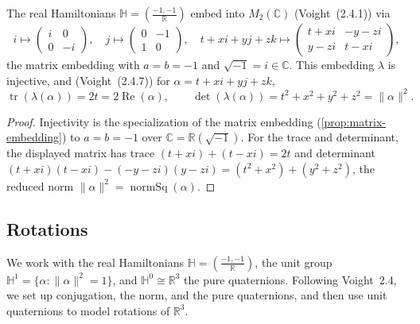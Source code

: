 \begin{lemma}
    \label{lem:hamilton-matrix}
    \leanok
    The real Hamiltonians $\mathbb{H} = \left(\frac{-1,-1}{\mathbb{R}}\right)$ embed
    into $M_2(\mathbb{C})$ (Voight~(2.4.1)) via
    \[
      i \mapsto \begin{pmatrix} i & 0 \\ 0 & -i \end{pmatrix}, \quad
      j \mapsto \begin{pmatrix} 0 & -1 \\ 1 & 0 \end{pmatrix}, \quad
      t + xi + yj + zk \mapsto
      \begin{pmatrix} t + xi & -y - zi \\ y - zi & t - xi \end{pmatrix},
    \]
    the matrix embedding with $a = b = -1$ and $\sqrt{-1} = i \in \mathbb{C}$. This
    embedding $\lambda$ is injective, and (Voight~(2.4.7)) for
    $\alpha = t + xi + yj + zk$,
    \[
      \operatorname{tr}(\lambda(\alpha)) = 2t = 2\operatorname{Re}(\alpha),
      \qquad
      \det(\lambda(\alpha)) = t^2 + x^2 + y^2 + z^2 = \lVert\alpha\rVert^2.
    \]
\end{lemma}
\begin{proof}
    Injectivity is the specialization of the matrix embedding
    (\ref{prop:matrix-embedding}) to $a = b = -1$ over
    $\mathbb{C} = \mathbb{R}(\sqrt{-1})$. For the trace and determinant, the
    displayed matrix has trace $(t + xi) + (t - xi) = 2t$ and determinant
    $(t + xi)(t - xi) - (-y - zi)(y - zi) = (t^2 + x^2) + (y^2 + z^2)$, the reduced
    norm $\lVert\alpha\rVert^2 = \operatorname{normSq}(\alpha)$.
\end{proof}

\subsection{Rotations}

We work with the real Hamiltonians $\mathbb{H} = \left(\frac{-1,-1}{\mathbb{R}}\right)$,
the unit group $\mathbb{H}^1 = \{\alpha : \lVert\alpha\rVert^2 = 1\}$, and
$\mathbb{H}^0 \cong \mathbb{R}^3$ the pure quaternions. Following Voight~2.4, we
set up conjugation, the norm, and the pure quaternions, and then use unit
quaternions to model rotations of $\mathbb{R}^3$.

